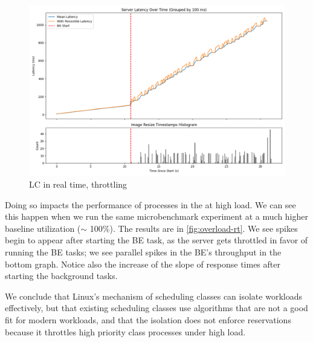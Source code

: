 \begin{figure}[t]
    \centering
    \includegraphics[width=\columnwidth]{graphs/overload-rt.png}
    \caption{LC in real time, throttling}\label{fig:overload-rt}
\end{figure}



Doing so impacts the performance of processes in the \rtclass{} at high load. We
can see this happen when we run the same microbenchmark experiment at a much
higher baseline utilization ($\sim$ 100\%). The results are in
\autoref{fig:overload-rt}. We see spikes begin to appear after starting the BE
task, as the \rtclass{} server gets throttled in favor of running the BE tasks;
we see parallel spikes in the BE's throughput in the bottom graph. Notice also
the increase of the slope of response times after starting the background tasks.

We conclude that Linux's mechanism of scheduling classes can isolate workloads
effectively, but that existing scheduling classes use algorithms that are not a
good fit for modern workloads, and that the isolation does not enforce
reservations because it throttles high priority class processes under high load.
